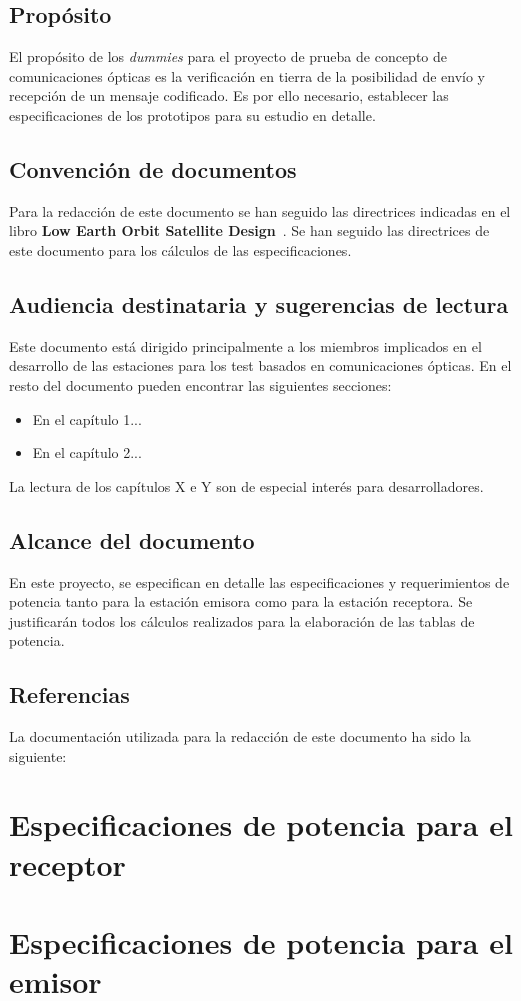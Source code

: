 \documentclass{scrreprt}
\begin{document}
\section{Propósito}

El propósito de los \textit{dummies} para el proyecto de prueba de concepto de comunicaciones ópticas es la verificación en tierra de la posibilidad de envío y recepción de un mensaje codificado. Es por ello necesario, establecer las especificaciones de los prototipos para su estudio en detalle.

\section{Convención de documentos}
Para la redacción de este documento se han seguido las directrices indicadas en el libro \textbf{Low Earth Orbit Satellite Design}~\cite{sebestyenlow2018}. Se han seguido las directrices de este documento para los cálculos de las especificaciones.

\section{Audiencia destinataria y sugerencias de lectura}
Este documento está dirigido principalmente a los miembros implicados en el desarrollo de las estaciones para los test basados en comunicaciones ópticas. En el resto del documento pueden encontrar las siguientes secciones:
\begin{itemize}
 \item En el capítulo 1...
 \item En el capítulo 2...
\end{itemize}

La lectura de los capítulos X e Y son de especial interés para desarrolladores.

\section{Alcance del documento}
En este proyecto, se especifican en detalle las especificaciones y requerimientos de potencia tanto para la estación emisora como para la estación receptora. Se justificarán todos los cálculos realizados para la elaboración de las tablas de potencia.

\section{Referencias}

La documentación utilizada para la redacción de este documento ha sido la siguiente:

\printbibliography[heading=none]

\chapter{Especificaciones de potencia para el receptor}

\chapter{Especificaciones de potencia para el emisor}
\end{document}
